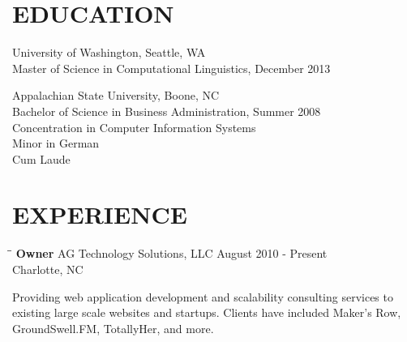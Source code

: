 \documentclass{res}
\begin{document}
 


\address{\large\bf  Anthony Gentile}
\address{6932 Loretta Place \\  Charlotte, NC 28215 \\  (704) 657-8550 \\ asgentile@gmail.com}
                                  
\begin{resume}      
 
\section{EDUCATION}   
    University of Washington, Seattle, WA  \\        
    Master of Science in Computational Linguistics, December 2013
           
    Appalachian State University, Boone, NC  \\        
    Bachelor of Science in Business Administration, Summer 2008   \\       
    Concentration in Computer Information Systems       \\   
    Minor in German  \\        
    Cum Laude

\section{EXPERIENCE}
   \vspace{-0.1in}	
   \begin{tabbing}
   \hspace{2.3in}\= \hspace{2.6in}\= \kill %
    {\bf Owner} \>AG Technology Solutions, LLC     \> August 2010 - Present\\
                             \>Charlotte, NC
   \end{tabbing}\vspace{-5pt}      %
    Providing web application development and scalability consulting services to existing large scale websites and startups. Clients have included Maker's Row, GroundSwell.FM, TotallyHer, and more.
    

\end{resume}
\end{document}
